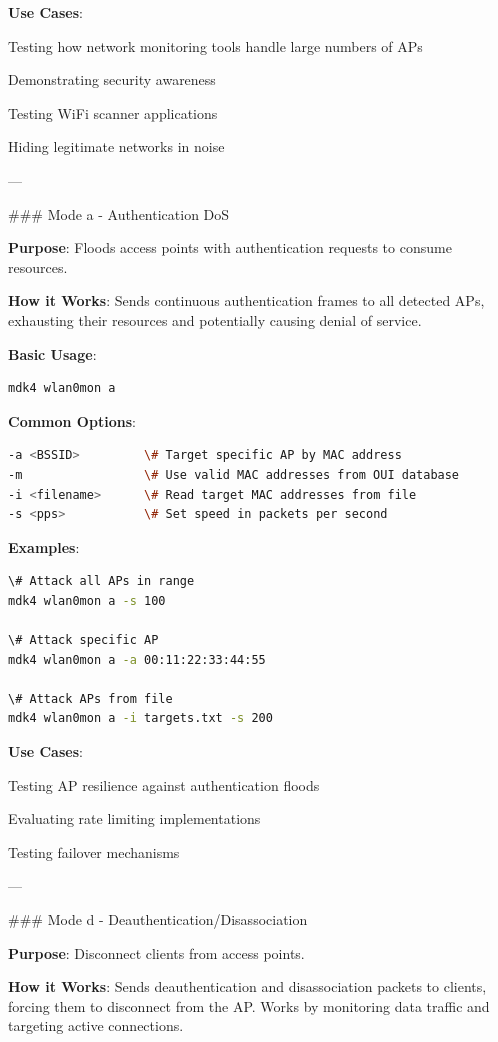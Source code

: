 \documentclass[11pt,a4paper]{article}
\begin{document}
\textbf{Use Cases}:
\item Testing how network monitoring tools handle large numbers of APs
\item Demonstrating security awareness
\item Testing WiFi scanner applications
\item Hiding legitimate networks in noise

---

\#\#\# Mode a - Authentication DoS

\textbf{Purpose}: Floods access points with authentication requests to consume resources.

\textbf{How it Works}: Sends continuous authentication frames to all detected APs, exhausting their resources and potentially causing denial of service.

\textbf{Basic Usage}:
\begin{lstlisting}[language=bash]
mdk4 wlan0mon a
\end{lstlisting}

\textbf{Common Options}:
\begin{lstlisting}[language=bash]
-a <BSSID>         \# Target specific AP by MAC address
-m                 \# Use valid MAC addresses from OUI database
-i <filename>      \# Read target MAC addresses from file
-s <pps>           \# Set speed in packets per second
\end{lstlisting}

\textbf{Examples}:
\begin{lstlisting}[language=bash]
\# Attack all APs in range
mdk4 wlan0mon a -s 100

\# Attack specific AP
mdk4 wlan0mon a -a 00:11:22:33:44:55

\# Attack APs from file
mdk4 wlan0mon a -i targets.txt -s 200
\end{lstlisting}

\textbf{Use Cases}:
\item Testing AP resilience against authentication floods
\item Evaluating rate limiting implementations
\item Testing failover mechanisms

---

\#\#\# Mode d - Deauthentication/Disassociation

\textbf{Purpose}: Disconnect clients from access points.

\textbf{How it Works}: Sends deauthentication and disassociation packets to clients, forcing them to disconnect from the AP. Works by monitoring data traffic and targeting active connections.
\end{document}
